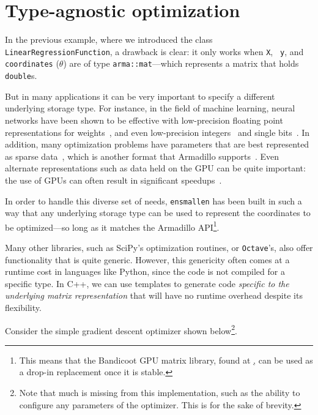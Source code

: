 \section{Type-agnostic optimization}
\label{sec:templated_optimize}


In the previous example, where we introduced the class {\tt
LinearRegressionFunction}, a drawback is clear: it only works when {\tt X}, {\tt
y}, and {\tt coordinates} ($\theta$) are of type {\tt arma::mat}---which
represents a matrix that holds {\tt double}s.

But in many applications it can be very important to specify a different
underlying storage type.  For instance, in the field of machine learning, neural
networks have been shown to be effective with low-precision floating point
representations for weights~\cite{TODO}, and even low-precision
integers~\cite{TODO} and single bits~\cite{TODO}.  In addition, many
optimization problems have parameters that are best represented as sparse
data~\cite{TODO}, which is another format that Armadillo supports~\cite{TODO}.
Even alternate representations such as data held on the GPU can be quite
important: the use of GPUs can often result in significant speedups~\cite{TODO}.

In order to handle this diverse set of needs, {\tt ensmallen} has been built in
such a way that any underlying storage type can be used to represent the
coordinates to be optimized---so long as it matches the Armadillo
API\footnote{This means that the Bandicoot GPU matrix library, found at
\href{https://gitlab.com/conradsnicta/bandicoot-code}, can be used as a drop-in
replacement once it is stable.}.

Many other libraries, such as SciPy's optimization routines, or {\tt Octave}'s,
also offer functionality that is quite generic.  However, this genericity often
comes at a runtime cost in languages like Python, since the code is not compiled
for a specific type.  In C++, we can use templates to generate code {\it
specific to the underlying matrix representation} that will have no runtime
overhead despite its flexibility.

Consider the simple gradient descent optimizer shown below\footnote{Note that
much is missing from this implementation, such as the ability to configure any
parameters of the optimizer.  This is for the sake of brevity.}.

